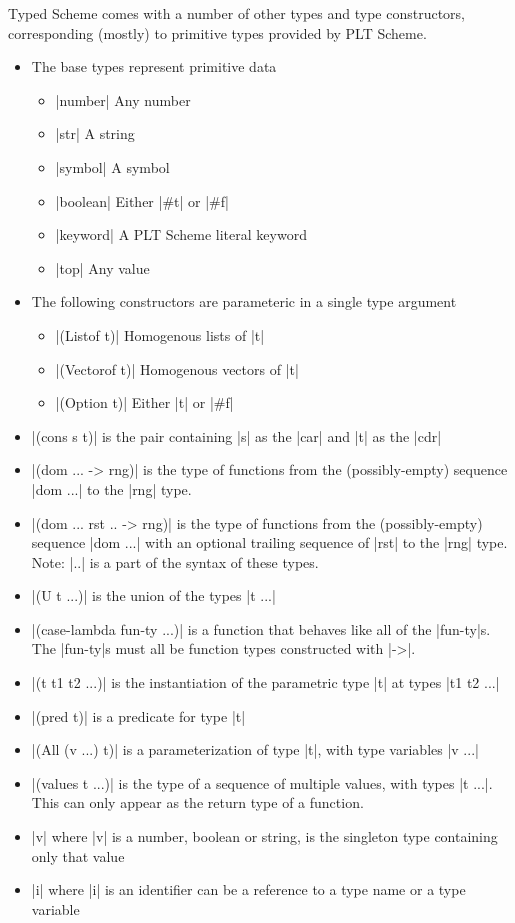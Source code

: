 \documentclass{book}
\begin{document}
\begin{schemeregion}
Typed Scheme comes with a number of other types and type constructors,
corresponding (mostly) to primitive types provided by PLT Scheme.

\renewcommand{\i}[2]{\item #1 #2}

\begin{itemize}
\item The base types represent primitive data
  \begin{itemize}
    \i{\scheme|number|}{Any number}
    \i{\scheme|str|}{A string}
    \i{\scheme|symbol|}{A symbol}
    \i{\scheme|boolean|}{Either \scheme|#t| or \scheme|#f|}
    \i{\scheme|keyword|}{A PLT Scheme literal keyword}
    \i{\scheme|top|}{Any value}
  \end{itemize}
\item The following constructors are parameteric in a single type argument
  \begin{itemize}
    \i{\scheme|(Listof t)|}{Homogenous lists of \scheme|t|}
    \i{\scheme|(Vectorof t)|}{Homogenous vectors of \scheme|t|}
    \i{\scheme|(Option t)|}{Either \scheme|t| or \scheme|#f|}
  \end{itemize}
\i{\scheme|(cons s t)|}{is the pair containing \scheme|s| as the \scheme|car|
  and \scheme|t| as the \scheme|cdr|}
\i{\scheme|(dom ... -> rng)|}{is the type of functions from the (possibly-empty)
  sequence \scheme|dom ...| to the \scheme|rng| type.}
\i{\scheme|(dom ... rst .. -> rng)|}{is the type of functions from the
  (possibly-empty) sequence \scheme|dom ...| with an optional trailing
  sequence of \scheme|rst| to the \scheme|rng| type. Note: \scheme|..| is a
  part of the syntax of these types.}
\i{\scheme|(U t ...)|}{is the union of the types \scheme|t ...|}
\i{\scheme|(case-lambda fun-ty ...)|}{is a function that behaves like all of
  the \scheme|fun-ty|s.  The \scheme|fun-ty|s must all be function
  types constructed with \scheme|->|.}
\i{\scheme|(t t1 t2 ...)|}{is the instantiation of the parametric type
  \scheme|t| at types \scheme|t1 t2 ...|}
\i{\scheme|(pred t)|}{is a predicate for type \scheme|t|}
\i{\scheme|(All (v ...) t)|}{is a parameterization of type \scheme|t|, with
  type variables \scheme|v ...|}
\i{\scheme|(values t ...)|}{is the type of a sequence of multiple values, with
types \scheme|t ...|.  This can only appear as the return type of a
function.}
\i{\scheme|v|}{where \scheme|v| is a number, boolean or string, is the singleton type containing
only that value}
\i{\scheme|i|}{where \scheme|i| is an identifier can be a reference to a type
name or a type variable}
\end{itemize}


\end{schemeregion}
\end{document}
